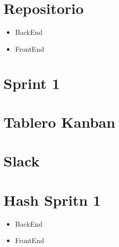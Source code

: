 \documentclass[a4paper,12 pt]{article}
\begin{document}
\section{Repositorio }

\begin{itemize}
    \item BackEnd
    \item FrontEnd
\end{itemize}

\section{Sprint 1}

\section*{Tablero Kanban}
\section*{Slack} 
\section*{Hash Spritn 1}
\begin{itemize}
    \item BackEnd
    \item FrontEnd
\end{itemize}
\end{document}
